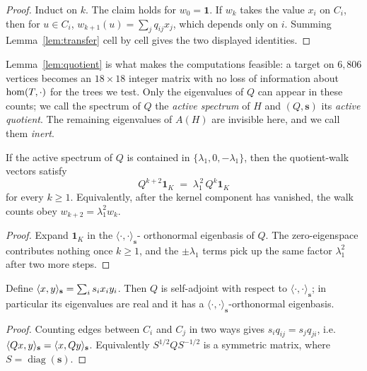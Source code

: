 \begin{proof}
  Induct on $k$. The claim holds for $w_0 = \mathbf{1}$. If $w_{k}$ takes
  the value $x_i$ on $C_i$, then for $u \in C_i$,
  $w_{k+1}(u) = \sum_j q_{ij} x_j$, which depends only on $i$. Summing
  Lemma~\ref{lem:transfer} cell by cell gives the two displayed
  identities.
\end{proof}

Lemma~\ref{lem:quotient} is what makes the computations feasible: a
target on $6{,}806$ vertices becomes an $18 \times 18$ integer matrix
with no loss of information about $\mathrm{hom}(T,\cdot)$ for the trees we test.
Only the eigenvalues of $Q$ can appear in these counts; we call the
spectrum of $Q$ the \emph{active spectrum} of $H$ and $(Q,\mathbf{s})$
its \emph{active quotient}. The remaining eigenvalues of $A(H)$ are
invisible here, and we call them \emph{inert}.

\begin{lemma}
  \label{lem:active_recurrence}
  If the active spectrum of $Q$ is contained in
  $\{\lambda_1, 0, -\lambda_1\}$, then the quotient-walk vectors satisfy
  \[
    Q^{k+2}\mathbf{1}_K \;=\; \lambda_1^{\,2}\, Q^k\mathbf{1}_K
  \]
  for every $k \ge 1$. Equivalently, after the kernel component has
  vanished, the walk counts obey $w_{k+2} = \lambda_1^2 w_k$.
\end{lemma}

\begin{proof}
  Expand $\mathbf{1}_K$ in the $\langle\cdot,\cdot\rangle_{\mathbf{s}}$-
  orthonormal eigenbasis of $Q$. The zero-eigenspace contributes nothing
  once $k \ge 1$, and the $\pm \lambda_1$ terms pick up the same factor
  $\lambda_1^2$ after two more steps.
\end{proof}

\begin{lemma}
  \label{lem:selfadjoint}
  Define $\langle x, y \rangle_{\mathbf{s}} = \sum_i s_i x_i y_i$. Then $Q$ is self-adjoint with
  respect to $\langle\cdot,\cdot\rangle_{\mathbf{s}}$; in particular its
  eigenvalues are real and it has a $\langle\cdot,\cdot\rangle_{\mathbf{s}}$-orthonormal
  eigenbasis.
\end{lemma}

\begin{proof}
  Counting edges between $C_i$ and $C_j$ in two ways gives
  $s_i q_{ij} = s_j q_{ji}$, i.e.\ $\langle Qx, y \rangle_{\mathbf{s}} = \langle x, Qy \rangle_{\mathbf{s}}$.
  Equivalently $S^{1/2} Q S^{-1/2}$ is a symmetric matrix, where
  $S = \operatorname{diag}(\mathbf{s})$.
\end{proof}

